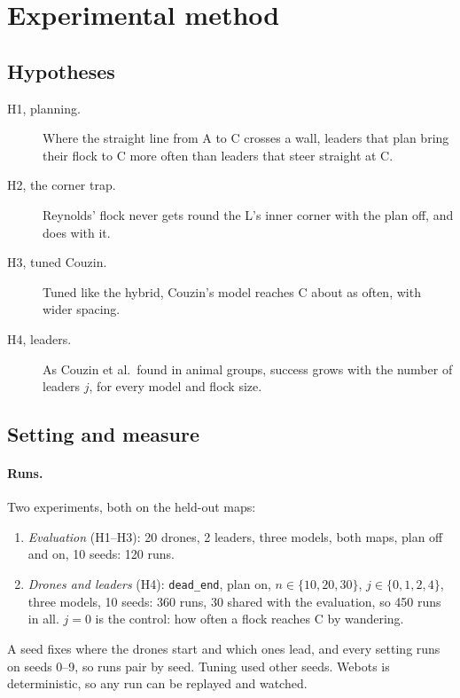 \section{Experimental method}
\label{sec:method}

\subsection{Hypotheses}
\label{sec:hypotheses}

\begin{description}
  \item[H1, planning.] Where the straight line from A to C crosses a wall,
    leaders that plan bring their flock to C more often than leaders that
    steer straight at C.
  \item[H2, the corner trap.] Reynolds' flock never gets round the L's inner
    corner with the plan off, and does with it.
  \item[H3, tuned Couzin.] Tuned like the hybrid, Couzin's model reaches C
    about as often, with wider spacing.
  \item[H4, leaders.] As Couzin et al.\ found in animal groups, success grows
    with the number of leaders $j$, for every model and flock size.
\end{description}

\subsection{Setting and measure}
\label{sec:setting}

\paragraph{Runs.} Two experiments, both on the held-out maps:
\begin{enumerate}
  \item \emph{Evaluation} (H1--H3): 20 drones, 2 leaders, three models, both
        maps, plan off and on, 10 seeds: 120 runs.
  \item \emph{Drones and leaders} (H4): \texttt{dead\_end}, plan on,
        $n \in \{10, 20, 30\}$, $j \in \{0, 1, 2, 4\}$, three models, 10 seeds:
        360 runs, 30 shared with the evaluation, so 450 runs in all.
        $j = 0$ is the control: how often a flock reaches C by wandering.
\end{enumerate}
A seed fixes where the drones start and which ones lead, and every setting
runs on seeds 0--9, so runs pair by seed. Tuning used other seeds. Webots is
deterministic, so any run can be replayed and watched.

